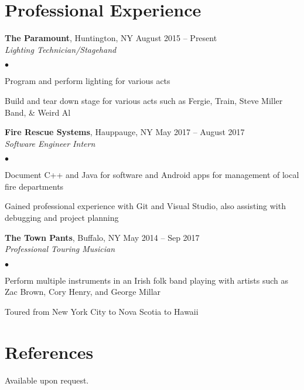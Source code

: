 \documentclass[margin,line]{res}
\newenvironment{list2}{
  \begin{list}{$\bullet$}{%
      \setlength{\itemsep}{0in}
      \setlength{\parsep}{0in} \setlength{\parskip}{0in}
      \setlength{\topsep}{0in} \setlength{\partopsep}{0in}
      \setlength{\leftmargin}{0.2in}}}{\end{list}}
\begin{document}
\begin{resume}
\section{\sc Professional Experience}
{\bf The Paramount}, Huntington, NY \hfill{August 2015 -- Present}\\
{\em Lighting Technician/Stagehand}\\
\begin{list2} %
\item Program and perform lighting for various acts\\
\item Build and tear down stage for various acts such as Fergie, Train, Steve Miller Band, \& Weird Al\\
\end{list2}
{\bf Fire Rescue Systems}, Hauppauge, NY \hfill{May 2017 -- August 2017}\\
{\em Software Engineer Intern}\\
\begin{list2} %
\item Document C++ and Java for software and Android apps for management of local fire departments\\
\item Gained professional experience with Git and Visual Studio, also assisting with debugging and project planning\\
\end{list2}
{\bf The Town Pants}, Buffalo, NY \hfill{May 2014 -- Sep 2017}\\
{\em Professional Touring Musician}\\
\begin{list2} %
\item Perform multiple instruments in an Irish folk band playing with artists such as Zac Brown, Cory Henry, and George Millar\\
\item Toured from New York City to Nova Scotia to Hawaii\\
\end{list2}

\section{\sc References }
Available upon request.

\end{resume}
\end{document}
